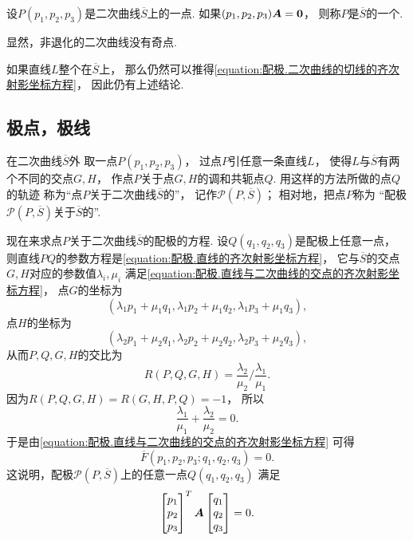 设\(P(p_1,p_2,p_3)\)是二次曲线\(\overline{S}\)上的一点.
如果\((p_1,p_2,p_3) \boldsymbol{A} = \boldsymbol0\)，
则称\(P\)是\(\overline{S}\)的一个.

显然，非退化的二次曲线没有奇点.

如果直线\(L\)整个在\(\overline{S}\)上，
那么仍然可以推得\cref{equation:配极.二次曲线的切线的齐次射影坐标方程}，
因此仍有上述结论.

\subsection{极点，极线}
在二次曲线\(\overline{S}\)外
取一点\(P(p_1,p_2,p_3)\)，
过点\(P\)引任意一条直线\(L\)，
使得\(L\)与\(\overline{S}\)有两个不同的交点\(G,H\)，
作点\(P\)关于点\(G,H\)的调和共轭点\(Q\).
用这样的方法所做的点\(Q\)的轨迹
称为“点\(P\)关于二次曲线\(\overline{S}\)的”，
记作\(\mathcal{P}(P,\overline{S})\)；
相对地，把点\(P\)称为
“配极\(\mathcal{P}(P,\overline{S})\)关于\(\overline{S}\)的”.

现在来求点\(P\)关于二次曲线\(\overline{S}\)的配极的方程.
设\(Q(q_1,q_2,q_3)\)是配极上任意一点，
则直线\(PQ\)的参数方程是\cref{equation:配极.直线的齐次射影坐标方程}，
它与\(\overline{S}\)的交点\(G,H\)对应的参数值\(\lambda_i,\mu_i\)
满足\cref{equation:配极.直线与二次曲线的交点的齐次射影坐标方程}，
点\(G\)的坐标为\begin{equation*}
	(
		\lambda_1 p_1 + \mu_1 q_1,
		\lambda_1 p_2 + \mu_1 q_2,
		\lambda_1 p_3 + \mu_1 q_3
	),
\end{equation*}
点\(H\)的坐标为\begin{equation*}
	(
		\lambda_2 p_1 + \mu_2 q_1,
		\lambda_2 p_2 + \mu_2 q_2,
		\lambda_2 p_3 + \mu_2 q_3
	),
\end{equation*}
从而\(P,Q,G,H\)的交比为\begin{equation*}
	R(P,Q,G,H)
	= \frac{\lambda_2}{\mu_2} \bigg/ \frac{\lambda_1}{\mu_1}.
\end{equation*}
因为\(
	R(P,Q,G,H)
	= R(G,H,P,Q)
	= -1
\)，
所以\begin{equation*}
	\frac{\lambda_1}{\mu_1}
	+ \frac{\lambda_2}{\mu_2}
	= 0.
\end{equation*}
于是由\cref{equation:配极.直线与二次曲线的交点的齐次射影坐标方程} 可得\begin{equation*}
	\overline{F}(p_1,p_2,p_3;q_1,q_2,q_3)
	= 0.
\end{equation*}
这说明，配极\(\mathcal{P}(P,\overline{S})\)上的任意一点\(Q(q_1,q_2,q_3)\)
满足\begin{equation}\label{equation:配极.配极的齐次射影坐标方程}
	\begin{bmatrix}
		p_1 \\ p_2 \\ p_3
	\end{bmatrix}^T
	\boldsymbol{A}
	\begin{bmatrix}
		q_1 \\ q_2 \\ q_3
	\end{bmatrix}
	= 0.
\end{equation}

